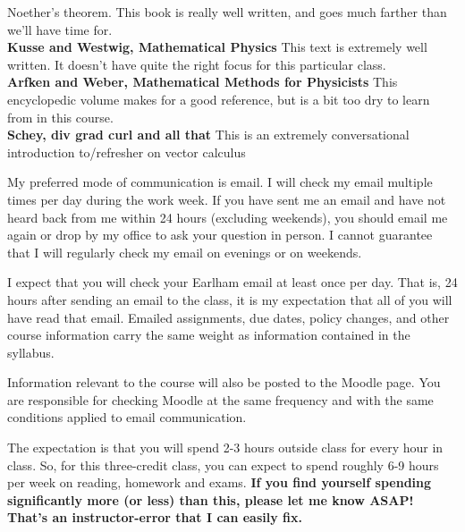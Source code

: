\documentclass[12pt]{article}
\begin{document}
{\begin{description}
        Noether's theorem. This book
        is really well written, and goes much farther than we'll have time
        for. \\
        \textbf{Kusse and Westwig, Mathematical Physics}
        This text is extremely well written. It doesn't have quite the right
        focus for this particular class. \\ 
        \textbf{Arfken and Weber, Mathematical Methods for Physicists}
        This encyclopedic volume makes for a good reference, but is a bit too
        dry to learn from in this course. \\ 
        \textbf{Schey, div grad curl and all that}
        This is an extremely conversational introduction to/refresher on vector calculus \\

  \item[Communication:] My preferred mode of communication is email. I
        will check my email multiple times per day during the work
        week. If you have sent me an email and have not heard back
        from me within 24 hours (excluding weekends), you should email
        me again or drop by my office to ask your question in
        person. I cannot guarantee that I will regularly check my
        email on evenings or on weekends. 
  
        I expect that you will check your Earlham email at least once per
        day. That is, 24 hours after sending an email to the class, it
        is my expectation that all of you will have read that
        email. Emailed assignments, due dates, policy changes, and
        other course information carry the same weight as information
        contained in the syllabus. 

        Information relevant to the course will also be posted to the Moodle
        page. You are responsible for checking Moodle at the same
        frequency and with the same conditions applied to email
        communication.
        \newpage
        
  \item[Workload Expectations:] The expectation is that you will spend
        2-3 hours outside class for every hour in class. So, for this
        three-credit class, you can expect to spend roughly 6-9 hours
        per week on reading, homework and exams. \textbf{If you find
        yourself spending significantly more (or less) than this,
        please let me know ASAP! That's an instructor-error that I can
        easily fix.}
        

\end{description}}
\end{document}
